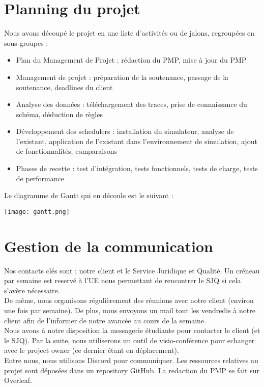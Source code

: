 \documentclass{article}
\begin{document}
\section{Planning du projet}
Nous avons découpé le projet en une liste d'activités ou de jalons, regroupées en sous-groupes :
\begin{itemize}
    \item Plan du Management de Projet : rédaction du PMP, mise à jour du PMP
    \item Management de projet : préparation de la soutenance, passage de la soutenance, deadlines du client
    \item Analyse des données : téléchargement des traces, prise de connaissance du schéma, déduction de règles
    \item Développement des schedulers : installation du simulateur, analyse de l'existant, application de l'existant dans l'environnement de simulation, ajout de fonctionnalités, comparaisons
    \item Phases de recette : test d'intégration, tests fonctionnels, tests de charge, tests de performance
\end{itemize}
Le diagramme de Gantt qui en découle est le suivant :
\begin{center}
    \texttt{[image: gantt.png]}
\end{center}



\section{Gestion de la communication}
Nos contacts clés sont : notre client et le Service Juridique et Qualité. Un créneau par semaine est reservé à l'UE nous permettant de rencontrer le SJQ si cela s'avère nécessaire. \\De même, nous organisons régulièrement des réunions avec notre client (environ une fois par semaine). De plus, nous envoyons un mail tout les vendredis à notre client afin de l'informer de notre avancée au cours de la semaine.\\
Nous avons à notre disposition la messagerie étudiante pour contacter le client (et le SJQ). Par la suite, nous utiliserons un outil de visio-conférence pour echanger avec le project owner (ce dernier étant en déplacement).\\
Entre nous, nous utilisons Discord pour communiquer. Les ressources relatives au projet sont déposées dans un repository GitHub. La redaction du PMP se fait sur Overleaf.
\end{document}
